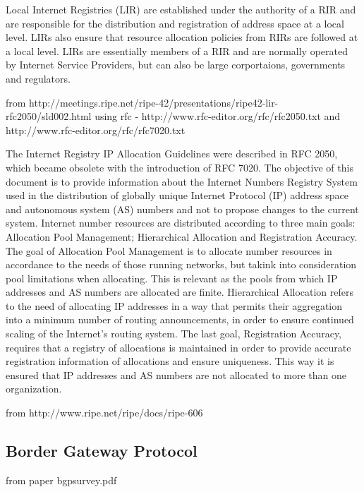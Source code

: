 \documentclass[11pt]{report}
\begin{document}
Local Internet Registries (LIR) are  established under the authority of a RIR and are responsible for the distribution and registration of address space at a local level. LIRs also ensure that resource allocation policies from RIRs are followed at a local level. LIRs are essentially members of a RIR and are normally operated by Internet Service Providers, but can also be large corportaions, governments and regulators.

from http://meetings.ripe.net/ripe-42/presentations/ripe42-lir-rfc2050/sld002.html using rfc - http://www.rfc-editor.org/rfc/rfc2050.txt and http://www.rfc-editor.org/rfc/rfc7020.txt

The Internet Registry IP Allocation Guidelines were described in RFC 2050, which became obsolete with the introduction of RFC 7020. The objective of this document is to provide information about the Internet Numbers Registry System used in the distribution of globally unique Internet Protocol (IP) address space and autonomous system (AS) numbers and not to propose changes to the current system. Internet number resources are distributed according to three main goals: Allocation Pool Management; Hierarchical Allocation and Registration Accuracy. The goal of Allocation Pool Management is to allocate number resources in accordance to the needs of those running networks, but takink into consideration pool limitations when allocating. This is relevant as the pools from which IP addresses and AS numbers are allocated are finite. Hierarchical Allocation refers to the need of allocating IP addresses in a way that permits their aggregation into a minimum number of routing announcements, in order to ensure continued scaling of the Internet's routing system. The last goal, Registration Accuracy,  requires that a registry of allocations is maintained in order to provide accurate registration information of allocations and ensure uniqueness. This way it is ensured that IP addresses and AS numbers are not allocated to more than one organization.  


   
from http://www.ripe.net/ripe/docs/ripe-606

\subsection{Border Gateway Protocol}

from paper bgpsurvey.pdf
\end{document}
